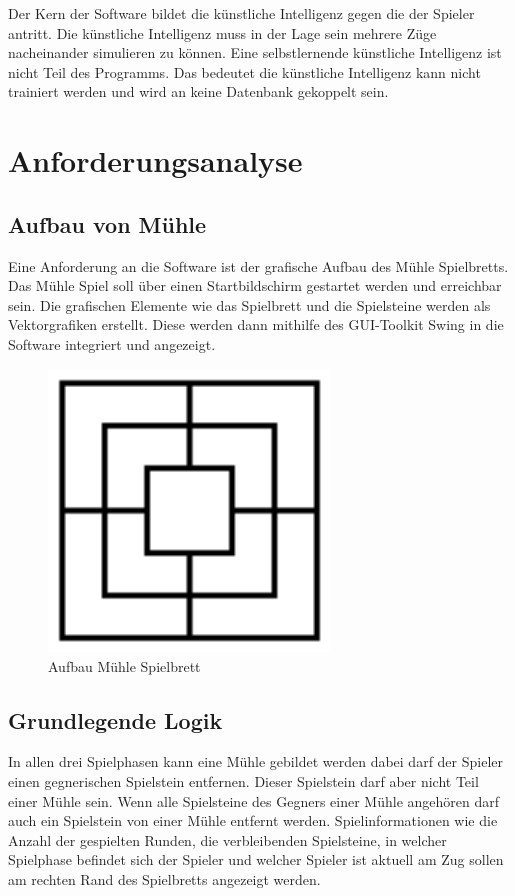 \documentclass[oneside]{ausarbeitung}
\begin{document}
Der Kern der Software bildet die künstliche Intelligenz gegen die der Spieler antritt. Die künstliche Intelligenz muss in der Lage sein mehrere Züge nacheinander simulieren zu können. Eine selbstlernende künstliche Intelligenz ist nicht Teil des Programms. Das bedeutet die künstliche Intelligenz kann nicht trainiert werden und wird an keine Datenbank gekoppelt sein.

\chapter{Anforderungsanalyse}

\section{Aufbau von Mühle}

Eine Anforderung an die Software ist der grafische Aufbau des Mühle Spielbretts. Das Mühle Spiel soll über einen Startbildschirm gestartet werden und erreichbar sein. Die grafischen Elemente wie das Spielbrett und die Spielsteine werden als Vektorgrafiken erstellt. Diese werden dann mithilfe des GUI-Toolkit Swing in die Software integriert und angezeigt.

\begin{figure}[ht]
	\centering
	\includegraphics[width=7.5cm,height=7.5cm]{images/gameboard.png}
	\caption[Aufbau Mühle Spielbrett]{Aufbau Mühle Spielbrett}
\end{figure}

\section{Grundlegende Logik}

In allen drei Spielphasen kann eine Mühle gebildet werden dabei darf der Spieler einen gegnerischen Spielstein entfernen. Dieser Spielstein darf aber nicht Teil einer Mühle sein. Wenn alle Spielsteine des Gegners einer Mühle angehören darf auch ein Spielstein von einer Mühle entfernt werden. Spielinformationen wie die Anzahl der gespielten Runden, die verbleibenden Spielsteine, in welcher Spielphase befindet sich der Spieler und welcher Spieler ist aktuell am Zug sollen am rechten Rand des Spielbretts angezeigt werden.
\end{document}
